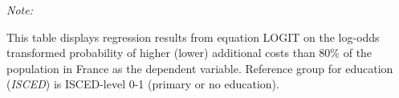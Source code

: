 \begin{table}[htbp!]
\begin{adjustbox}{width = 1\textwidth, max height = 0.95\textheight, center}
\begin{threeparttable}[b]
         \begin{tablenotes}\item \medskip \textit{Note:}
            \item This table displays regression results from equation LOGIT on the log-odds transformed probability of higher (lower) additional costs than 80\% of the population in France as the dependent variable. Reference group for education (\textit{ISCED}) is ISCED-level 0-1 (primary or no education).
         \end{tablenotes}
      \end{threeparttable}
   \end{adjustbox}
\end{table}


